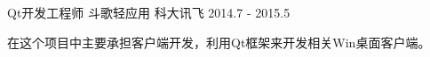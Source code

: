 \begin{cventries}
  \cventry
    {Qt开发工程师} %
    {斗歌轻应用} %
    {科大讯飞} %
    {2014.7 - 2015.5} %
    {
      \begin{cvitems} %
        \item {在这个项目中主要承担客户端开发，利用Qt框架来开发相关Win桌面客户端。}
      \end{cvitems}
    }


\end{cventries}
